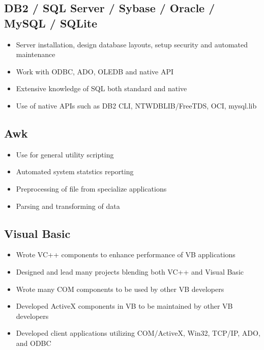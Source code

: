 \documentclass[10pt]{report}
\begin{document}
\subsection*{DB2 / SQL Server / Sybase / Oracle / MySQL / SQLite}
\begin{itemize}
\item Server installation, design database layouts, setup security and automated maintenance
\item Work with ODBC, ADO, OLEDB and native API
\item Extensive knowledge of SQL both standard and native
\item Use of native APIs such as DB2 CLI, NTWDBLIB/FreeTDS, OCI, mysql.lib
\end{itemize}


\subsection*{Awk}
\begin{itemize}
\item Use for general utility scripting 
\item Automated system statstics reporting
\item Preprocessing of file from specialize applications
\item Parsing and transforming of data
\end{itemize}


\subsection*{Visual Basic}
\begin{itemize}
\item Wrote VC++ components to enhance performance of VB applications
\item Designed and lead many projects blending both VC++ and Visual Basic
\item Wrote many COM components to be used by other VB developers
\item Developed ActiveX components in VB to be maintained by other VB developers
\item Developed client applications utilizing COM/ActiveX, Win32, TCP/IP, ADO, and ODBC

\end{itemize}
\end{document}
